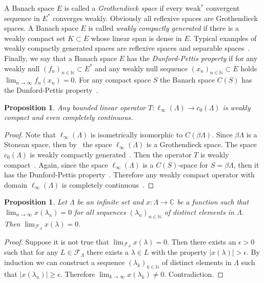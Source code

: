 \documentclass[12pt]{article}
\newtheorem{proposition}[theorem]{Proposition}
\begin{document}
A Banach space $E$ is called a \textit{Grothendieck space} if every weak$^*$
convergent sequence in $E^*$ converges weakly. Obviously all reflexive spaces
are Grothendieck spaces. A Banach space $E$ is 
called \textit{weakly compactly generated} if there is a weakly 
compact set $K\subset E$ whose linear span is
dense in $E$. Typical examples of weakly compactly generated spaces are
reflexive spaces and separable spaces~\cite[paragraph 13.1]{FabHabBanSpTh}.
Finally, we say that a Banach space $E$ has the \textit{Dunford-Pettis property}
if for any weakly null ${(f_n)}_{n\in\mathbb{N}}\subset E^*$ and any weakly null
sequence ${(x_n)}_{n\in\mathbb{N}}\subset E$ holds $\lim_{n\to\infty}
    f_n(x_n)=0$. For any compact space $S$ the Banach space $C(S)$ has the
Dunford-Pettis property~\cite{DunfPetLinOpSumFunc}.

\begin{proposition}\label{OpLInfc0CompContWeakComp} Any bounded linear operator
    $T:\ell_\infty(\Lambda)\to c_0(\Lambda)$ is weakly compact and even
    completely continuous.
\end{proposition}
\begin{proof} Note that $\ell_\infty(\Lambda)$ is isometrically isomorphic to
    $C(\beta\Lambda)$. Since $\beta\Lambda$ is a Stonean space, then
    by~\cite[theorem 9, p. 168]{GrothApplFabilCompCK} the space
    $\ell_\infty(\Lambda)$ is a Grothendieck space. The space $c_0(\Lambda)$ is
    weakly compactly generated~\cite[paragraph 13.1 example
        (iii)]{FabHabBanSpTh}. Then the operator $T$ is weakly
    compact~\cite[exercise 13.33]{FabHabBanSpTh}. Again, since the space
    $\ell_\infty(\Lambda)$ is a $C(S)$-space for $S=\beta\Lambda$, then it has
    the Dunford-Pettis property~\cite[theorem 13.43]{FabHabBanSpTh}. Therefore
    any weakly compact operator with domain $\ell_\infty(\Lambda)$ is completely
    continuous~\cite[proposition 13.42]{FabHabBanSpTh}.
\end{proof}

\begin{proposition}\label{FrechFiltConvCharac} Let $\Lambda$ be an infinite set
    and $x:\Lambda\to\mathbb{C}$ be a function such that $\lim_{n\to\infty}
        x(\lambda_n)=0$ for all sequences ${(\lambda_n)}_{n\in\mathbb{N}}$ of
    distinct elements in $\Lambda$. Then
    $\lim_{\mathcal{F}_{\Lambda}}x(\lambda)=0$.
\end{proposition}
\begin{proof} Suppose it is not true that
    $\lim_{\mathcal{F}_{\Lambda}}x(\lambda)=0$. Then there exists an 
    $\epsilon > 0$ such that for any $L\in\mathcal{F}_{\Lambda}$ 
    there exists a $\lambda\in L$ with the property 
    $|x(\lambda)|>\epsilon$. By induction we can construct
    a sequence ${(\lambda_k)}_{k\in\mathbb{N}}$ of distinct elements in
    $\Lambda$ such that $|x(\lambda_n)|\geq \epsilon$. Therefore
    $\lim_{k\to\infty} x(\lambda_k)\neq 0$. Contradiction.
\end{proof}
\end{document}
